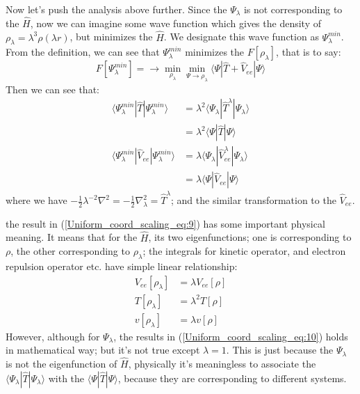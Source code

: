 Now let's push the analysis above further. Since the $\Psi_{\lambda}$ is not
corresponding to the $\hat{H}$, now we can imagine some wave function which
gives the density of $\rho_{\lambda} = \lambda^{3}\rho(\lambda r)$, but
minimizes the $\hat{H}$. We designate this wave function as
$\Psi_{\lambda}^{min}$. From the definition, we can see that
$\Psi_{\lambda}^{min}$ minimizes the $F[\rho_{\lambda}]$, that is to say:
\begin{equation}
  \label{Uniform_coord_scaling_eq:8} 
  F[\Psi_{\lambda}^{min}] =  \rightarrow
\min_{\rho_{\lambda}}\min_{\Psi\rightarrow\rho_{\lambda}}
\langle\Psi|\hat{T} +
\hat{V}_{ee}|\Psi\rangle
\end{equation} 
Then we can see that:
\begin{equation}
 \begin{split}
\langle\Psi^{min}_{\lambda}|\hat{T}|\Psi^{min}_{\lambda}\rangle &=
\lambda^{2}\langle\Psi_{\lambda}|\hat{T}^{\lambda}|\Psi_{\lambda}\rangle \\
&=\lambda^{2} \langle\Psi|\hat{T}|\Psi\rangle \\
\langle\Psi^{min}_{\lambda}|\hat{V}_{ee}|\Psi^{min}_{\lambda}\rangle &=
\lambda\langle\Psi_{\lambda}|\hat{V}_{ee}^{\lambda}|\Psi_{\lambda}\rangle \\
&=\lambda \langle\Psi|\hat{V}_{ee}|\Psi\rangle
 \end{split}
\label{Uniform_coord_scaling_eq:9}
\end{equation}
where we have $-\frac{1}{2}\lambda^{-2}\nabla^{2} =
-\frac{1}{2}\nabla^{2}_{\lambda} = \hat{T}^{\lambda}$; and the similar
transformation to the $\hat{V}_{ee}$.

the result in (\ref{Uniform_coord_scaling_eq:9}) has some important physical
meaning. It means that for the $\hat{H}$, its two eigenfunctions; one is
corresponding to $\rho$, the other corresponding to $\rho_{\lambda}$; the
integrals for kinetic operator, and electron repulsion operator etc. have simple
linear relationship:
\begin{align}
 \label{Uniform_coord_scaling_eq:10}
  V_{ee}[\rho_{\lambda}] &= \lambda V_{ee}[\rho] \nonumber \\
  T[\rho_{\lambda}] &= \lambda^{2} T[\rho] \nonumber \\
  v[\rho_{\lambda}] &= \lambda v[\rho]
\end{align}
However, although for $\Psi_{\lambda}$, the results in
(\ref{Uniform_coord_scaling_eq:10}) holds in mathematical way; but it's not
true except $\lambda = 1$. This is just because the $\Psi_{\lambda}$ is not
the eigenfunction of $\hat{H}$, physically it's meaningless to associate the
$\langle\Psi_{\lambda}|\hat{T}|\Psi_{\lambda}\rangle$ with the
$\langle\Psi|\hat{T}|\Psi\rangle$, because they are corresponding to different
systems.

